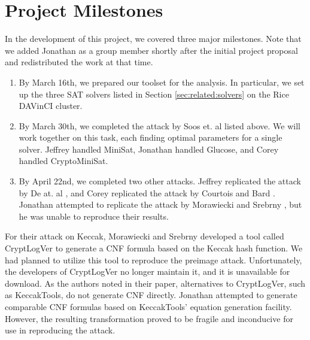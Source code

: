 \appendix
\section{Project Milestones}
\label{sec:milestones}

In the development of this project, we covered three major milestones. Note that we added Jonathan as a group member shortly after the initial project proposal and redistributed the work at that time.
\begin{enumerate}
	\item By March 16th, we prepared our toolset for the analysis. In particular, we set up the three SAT solvers listed in Section \ref{sec:related:solvers} on the Rice DAVinCI cluster.
	
	\item By March 30th, we completed the attack by Soos et. al \cite{SNC09} listed above. We will work together on this task, each finding optimal parameters for a single solver. Jeffrey handled MiniSat, Jonathan handled Glucose, and Corey handled CryptoMiniSat.
	
	\item By April 22nd, we completed two other attacks. Jeffrey replicated the attack by De at. al \cite{DKV07}, and Corey replicated the attack by Courtois and Bard \cite{CB07}. Jonathan attempted to replicate the attack by Morawiecki and Srebrny \cite{MS13}, but he was unable to reproduce their results.
\end{enumerate}

For their attack on Keccak, Morawiecki and Srebrny developed a tool called CryptLogVer to generate a CNF formula based on the Keccak hash function. We had planned to utilize this tool to reproduce the preimage attack. Unfortunately, the developers of CryptLogVer no longer maintain it, and it is unavailable for download. As the authors noted in their paper, alternatives to CryptLogVer, such as KeccakTools, do not generate CNF directly. Jonathan attempted to generate comparable CNF formulas based on KeccakTools' equation generation facility. However, the resulting transformation proved to be fragile and inconducive for use in reproducing the attack.